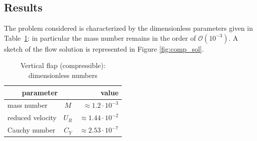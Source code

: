 \subsection{Results}

The problem considered is characterized by the dimensionless parameters given in Table~\ref{table:comp-adim}: in particular the mass number remains in the order of $\mathcal{O} \left(10^{-3}\right)$. A sketch of the flow solution is represented in Figure \ref{fig:comp_sol}.

\begin{table}[!htb]
	\begin{center}
		\begin{tabular}{ l c | r } 
			\multicolumn{2}{c|}{parameter} & value   \\ 
			\hline
			mass number  & $M$ & $ \approx 1.2\cdot 10^{-3}$     \\
			reduced velocity & $U_R$ & $ \approx 1.44\cdot 10^{-2}$  \\
			Cauchy number  & $C_Y$ & $  \approx 2.53 \cdot 10^{-7}$  \\			
		\end{tabular}
	\end{center}
	\caption{Vertical flap (compressible): dimensionless numbers}
	\label{table:comp-adim}
\end{table}

